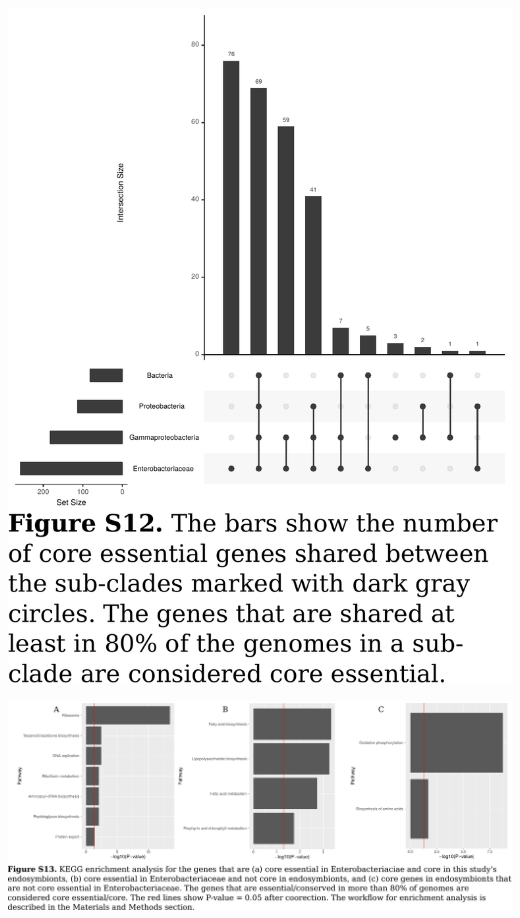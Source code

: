 \documentclass{article}
\newcommand{\Newpage}{\end{preview}\begin{preview}}
\begin{document}
\begin{preview}
\includegraphics{suppl12.pdf}
\Newpage
\includegraphics{suppl13.pdf}
\Newpage

\end{preview}
\end{document}
